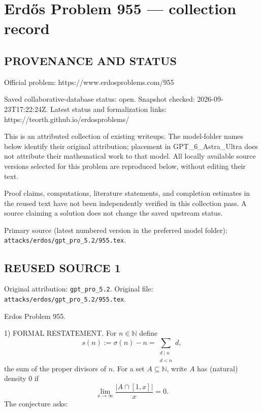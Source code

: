 \section*{Erd\H{o}s Problem 955 --- collection record}

\subsection*{PROVENANCE AND STATUS}
Official problem: https://www.erdosproblems.com/955

Saved collaborative-database status: open.
Snapshot checked: 2026-09-23T17:22:24Z.
Latest status and formalization links: https://teorth.github.io/erdosproblems/

This is an attributed collection of existing writeups. The model-folder names below identify their original attribution; placement in GPT\_6\_Astra\_Ultra does not attribute their mathematical work to that model. All locally available source versions selected for this problem are reproduced below, without editing their text.

Proof claims, computations, literature statements, and completion estimates in the reused text have not been independently verified in this collection pass. A source claiming a solution does not change the saved upstream status.

Primary source (latest numbered version in the preferred model folder): \texttt{attacks/erdos/gpt\_pro\_5.2/955.tex}.

\subsection*{REUSED SOURCE 1}
Original attribution: \texttt{gpt\_pro\_5.2}.
Original file: \texttt{attacks/erdos/gpt\_pro\_5.2/955.tex}.


Erdos Problem 955.

1) FORMAL RESTATEMENT.
For $n\in\mathbb{N}$ define
\[
 s(n):=\sigma(n)-n=\sum_{\substack{d\mid n\\ d<n}} d,
\]
the sum of the proper divisors of $n$.
For a set $A\subseteq\mathbb{N}$, write $A$ has (natural) density $0$ if
\[
\lim_{x\to\infty} \frac{|A\cap [1,x]|}{x}=0.
\]
The conjecture asks:

